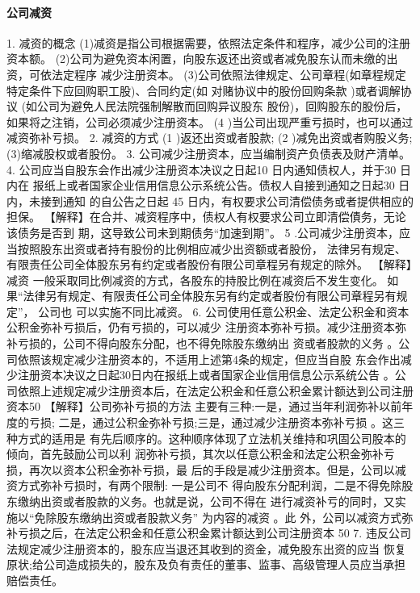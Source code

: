 \documentclass[UTF8,12pt]{ctexart}
\numberwithin{equation}{section} %
\numberwithin{figure}{section}
\numberwithin{table}{section}
\begin{document}
	\paragraph{公司减资}
	1. 减资的概念 (1)减资是指公司根据需要，依照法定条件和程序，减少公司的注册资本额。 (2)公司为避免资本闲置，向股东返还出资或者减免股东认而未缴的出资，可依法定程序 减少注册资本。 (3)公司依照法律规定、公司章程(如章程规定特定条件下应回购职工股)、合同约定(如 对赌协议中的股份回购条款 )或者调解协议 (如公司为避免人民法院强制解散而回购异议股东 股份)，回购股东的股份后，如果将之注销，公司必须减少注册资本。
	(4 )当公司出现严重亏损时，也可以通过减资弥补亏损。
	2. 减资的方式
	(1 )返还出资或者股款;
	(2 )减免出资或者购股义务;
	(3)缩减股权或者股份。
	3. 公司减少注册资本，应当编制资产负债表及财产清单。
	4. 公司应当自股东会作出减少注册资本决议之日起10 日内通知债权人，并于30 日内在 报纸上或者国家企业信用信息公示系统公告。债权人自接到通知之日起30 日内，未接到通知 的自公告之日起 45 日内，有权要求公司清偿债务或者提供相应的担保。
	【解释】在合并、减资程序中，债权人有权要求公司立即清偿債务，无论该债务是否到 期，这导致公司未到期债务“加速到期”。
	5 .公司减少注册资本，应当按照股东出资或者持有股份的比例相应减少出资额或者股份， 法律另有规定、有限责任公司全体股东另有约定或者股份有限公司章程另有规定的除外。
	【解释】减资 一般采取同比例减资的方式，各股东的持股比例在减资后不发生变化。 如果“法律另有规定、有限责任公司全体股东另有约定或者股份有限公司章程另有规定”， 公司也 可以实施不同比减资。
	6. 公司使用任意公积金、法定公积金和资本公积金弥补亏损后，仍有亏损的，可以减少 注册资本弥补亏损。减少注册资本弥补亏损的，公司不得向股东分配，也不得免除股东缴纳出 资或者股款的义务 。公司依照该规定减少注册资本的，不适用上述第4条的规定，但应当自股 东会作出减少注册资本决议之日起30日内在报纸上或者国家企业信用信息公示系统公告 。公 司依照上述规定减少注册资本后，在法定公积金和任意公积金累计额达到公司注册资本50%
	【解释】公司弥补亏损的方法 主要有三种:一是，通过当年利润弥补以前年度的亏损; 二是，通过公积金弥补亏损;三是，通过减少注册资本弥补亏损 。这三种方式的适用是 有先后顺序的。这种顺序体现了立法机关维持和巩固公司股本的倾向，首先鼓励公司以利 润弥补亏损，其次以任意公积金和法定公积金弥补亏损，再次以资本公积金弥补亏损，最 后的手段是减少注册资本。但是，公司以减资方式弥补亏损时，有两个限制: 一是公司不 得向股东分配利润，二是不得免除股东缴纳出资或者股款的义务。也就是说，公司不得在 进行减资补亏的同时，又实施以“免除股东缴纳出资或者股款义务” 为内容的减资 。此 外，公司以减资方式弥补亏损之后，在法定公积金和任意公积金累计额达到公司注册资本 50%
	7. 违反公司法规定减少注册资本的，股东应当退还其收到的资金，减免股东出资的应当 恢复原状;给公司造成损失的，股东及负有责任的董事、监事、高级管理人员应当承担赔偿责任。
	
\end{document}
